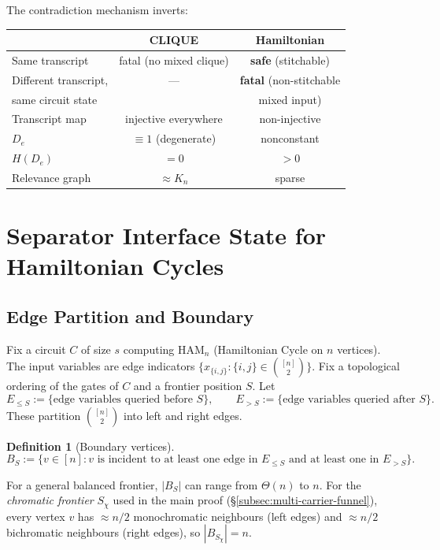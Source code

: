 \documentclass[11pt]{article}
\newtheorem{definition}[theorem]{Definition}
\newcommand{\Ham}{\mathrm{HAM}}
\begin{document}
The contradiction mechanism inverts:
\begin{center}
\begin{tabular}{lcc}
  & \textbf{CLIQUE} & \textbf{Hamiltonian} \\
\hline
Same transcript & fatal (no mixed clique)
  & \textbf{safe} (stitchable) \\
Different transcript, & --- & \textbf{fatal}
  (non-stitchable \\
\quad same circuit state & & \quad mixed input) \\
Transcript map & injective everywhere & non-injective \\
$D_e$ & $\equiv 1$ (degenerate) & nonconstant \\
$H(D_e)$ & $= 0$ & $> 0$ \\
Relevance graph & $\approx K_n$ & sparse \\
\end{tabular}
\end{center}


\section{Separator Interface State for Hamiltonian Cycles}
\label{sec:separator-state}

\subsection{Edge Partition and Boundary}

Fix a circuit $C$ of size $s$ computing $\Ham_n$
(Hamiltonian Cycle on $n$ vertices).
The input variables are edge indicators
$\{x_{\{i,j\}} : \{i,j\} \in \binom{[n]}{2}\}$.
Fix a topological ordering of the gates of $C$ and a
frontier position $S$.  Let
\[
  E_{\le S} := \{\text{edge variables queried before } S\},
  \qquad
  E_{> S} := \{\text{edge variables queried after } S\}.
\]
These partition $\binom{[n]}{2}$ into left and right edges.

\begin{definition}[Boundary vertices]
\label{def:boundary}
\[
  B_S := \{v \in [n] : v \text{ is incident to at least one
  edge in } E_{\le S} \text{ and at least one in } E_{> S}\}.
\]
\end{definition}

For a general balanced frontier, $|B_S|$ can range from
$\Theta(n)$ to $n$.  For the \emph{chromatic frontier}
$S_\chi$ used in the main proof (\S\ref{subsec:multi-carrier-funnel}),
every vertex $v$ has $\approx n/2$ monochromatic neighbours
(left edges) and $\approx n/2$ bichromatic neighbours (right edges),
so $|B_{S_\chi}| = n$.
\end{document}
